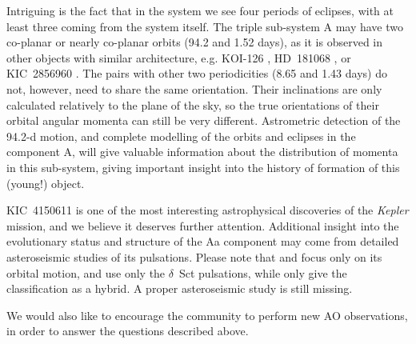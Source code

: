 \documentclass{aa}
\newcommand{\kep}{{\it Kepler }}
\begin{document}
Intriguing is the fact that in the system we see four periods of eclipses, with at 
least three coming from the system itself. The triple sub-system A may have two co-planar 
or nearly co-planar orbits (94.2 and 1.52 days), as it is observed in other objects with 
similar architecture, e.g. KOI-126 \citep{car11}, HD~181068 \citep{der11,bor12}, or 
KIC~2856960 \citep{lee13}. The pairs with other two periodicities (8.65 and 1.43 days) 
do not, however, need to share the same orientation. Their inclinations are only calculated 
relatively to the plane of the sky, so the true orientations of their orbital angular momenta 
can still be very different. Astrometric detection of the 94.2-d motion, and complete modelling 
of the orbits and eclipses in the component A, will give valuable information about the 
distribution of momenta in this sub-system, giving important insight into the history of 
formation of this (young!) object.

KIC~4150611 is one of the most interesting astrophysical discoveries of the \kep 
mission, and we believe it deserves further attention. Additional insight into
the evolutionary status and structure of the Aa component may come from detailed
asteroseismic studies of its pulsations. Please note that \citet{shi12} and
\citet{bal14} focus only on its orbital motion, and use only the $\delta$~Sct
pulsations, while \citet{uyt11} only give the classification as a  hybrid. A proper
asteroseismic study is still missing.
 
We would also like to encourage the community to perform new AO observations, in
order to answer the questions described above.

\end{document}
